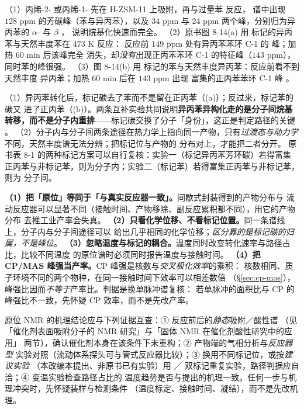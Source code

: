 \begin{obs}
（1）丙烯-2- 或丙烯-1- 先在 H-ZSM-11 上吸附，再与过量苯
反应， 谱中出现 $128$ ppm 的芳碳峰（苯与异丙苯），以及 $34$ ppm 与
$24$ ppm 两个峰，分别归为异丙苯的 $\alpha$- 与 $\beta$-，
说明烷基化快速而完全。
（2）原书图 8-14(a) 用  标记的异丙苯与天然丰度苯在 $473$ K 反应：
反应前 $149$ ppm 处有异丙苯苯环 C-1 的  峰；加热 $60$ min 后该峰完全
消失，却\emph{没有}出现正丙苯苯环 C-1 的特征峰（$143$ ppm），同时苯的峰很强。
（3）图 8-14(b) 用  标记的苯与天然丰度异丙苯：反应前看不到天然丰度
异丙苯；加热 $60$ min 后在 $143$ ppm 出现  富集的正丙苯苯环 C-1 峰
。
\end{obs}

\begin{infer}
（1）异丙苯转化后，标记碳去了苯而不是留在正丙苯（(a)）；反过来，标记苯的碳又
进了正丙苯（(b)）。两条互补实验共同说明\textbf{异丙苯异构化走的是分子间烷基
转移，而不是分子内重排}——标记碳交换了分子「身份」，这正是判定路径的关键
。
（2）分子内与分子间两条途径在热力学上指向同一产物，只有\emph{过渡态与动力学}
不同，天然丰度谱无法分辨；把标记位与产物的  分布对上，才能把二者分开。
原书表 8-1 的两种标记方案可以自行复核：实验一（标记异丙苯芳环碳）若得富集
正丙苯与非标记苯，则为分子内；实验二（标记苯）若得富集正丙苯与非标记苯，则为
分子间。
\end{infer}

\begin{pitfall}
\textbf{（1）把「原位」等同于「与真实反应器一致」。}间歇式封装得到的产物分布与
流动反应器可以显著不同（接触时间、产物移除、副反应累积都不同），用它的产物分布
去推工业产率会失真。
\textbf{（2）只看化学位移、不看标记位置。}同一条谱线上，分子内与分子间途径可以
给出几乎相同的化学位移；\emph{区分靠的是标记碳的归属，不是峰位}。
\textbf{（3）忽略温度与标记的耦合。}温度同时改变转化速率与路径占比，比较不同温度
的原位谱时必须同时报告温度与接触时间。
\textbf{（4）把 CP/MAS 峰强当产率。}CP 峰强是核数与\emph{交叉极化效率}的乘积：
核数相同、质子环境不同的两个物种，在同一接触时间下效率可以相差数倍
（\S\ref{sec:cp-mas}），峰强比因而\emph{不等于}产率比。判据是换单脉冲谱复核：
若单脉冲的面积比与 CP 的峰强比不一致，先怀疑 CP 效率，而不是先改产率。
\end{pitfall}

\begin{crosscheck}
原位 NMR 的机理结论应与下列证据互查：① 反应前后的\emph{静态}吸附／酸性谱
（见「催化剂表面吸附分子的 NMR 研究」与「固体 NMR 在催化剂酸性研究中的应用」
两节），确认催化剂本身在该条件下未重构；② 产物端的气相分析与\emph{反应器型}
实验对照（流动体系探头可与管式反应器比较）；③ 换用不同标记位，或按\emph{建议实验}
（本改编本提出、非原书已有实验）用 ／ 双标记重复实验，路径判据应自洽；④ 变温实验检查路径占比的
温度趋势是否与提出的机理一致。任何一步与机理冲突时，先怀疑装样与检测条件
（温度标定、接触时间、凝结），而不是先改机理。
\end{crosscheck}

